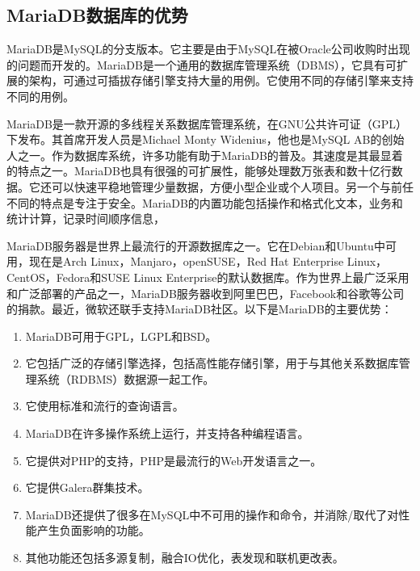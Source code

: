 \subsection{MariaDB数据库的优势}
MariaDB是MySQL的分支版本。它主要是由于MySQL在被Oracle公司收购时出现的问题而开发的。MariaDB是一个通用的数据库管理系统（DBMS），它具有可扩展的架构，可通过可插拔存储引擎支持大量的用例。它使用不同的存储引擎来支持不同的用例。
\par
MariaDB是一款开源的多线程关系数据库管理系统，在GNU公共许可证（GPL）下发布。其首席开发人员是Michael Monty Widenius，他也是MySQL AB的创始人之一。作为数据库系统，许多功能有助于MariaDB的普及。其速度是其最显着的特点之一。MariaDB也具有很强的可扩展性，能够处理数万张表和数十亿行数据。它还可以快速平稳地管理少量数据，方便小型企业或个人项目。另一个与前任不同的特点是专注于安全。MariaDB的内置功能包括操作和格式化文本，业务和统计计算，记录时间顺序信息，
\par
MariaDB服务器是世界上最流行的开源数据库之一。它在Debian和Ubuntu中可用，现在是Arch Linux，Manjaro，openSUSE，Red Hat Enterprise Linux，CentOS，Fedora和SUSE Linux Enterprise的默认数据库。作为世界上最广泛采用和广泛部署的产品之一，MariaDB服务器收到阿里巴巴，Facebook和谷歌等公司的捐款。最近，微软还联手支持MariaDB社区。以下是MariaDB的主要优势：
\begin{enumerate}
	\item MariaDB可用于GPL，LGPL和BSD。
	\item 它包括广泛的存储引擎选择，包括高性能存储引擎，用于与其他关系数据库管理系统（RDBMS）数据源一起工作。
	\item 它使用标准和流行的查询语言。
	\item MariaDB在许多操作系统上运行，并支持各种编程语言。
	\item 它提供对PHP的支持，PHP是最流行的Web开发语言之一。
	\item 它提供Galera群集技术。
	\item MariaDB还提供了很多在MySQL中不可用的操作和命令，并消除/取代了对性能产生负面影响的功能。
	\item 其他功能还包括多源复制，融合IO优化，表发现和联机更改表。
\end{enumerate}
